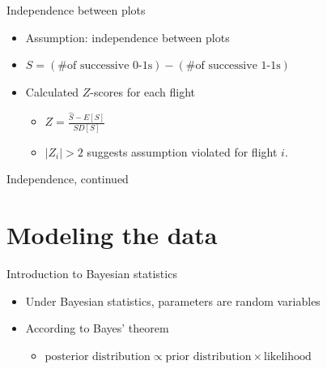 \documentclass{beamer}
\begin{document}
\begin{frame}{Independence between plots}
	\begin{itemize}
		\item Assumption: independence between plots
		\item $S=(\text{\# of successive 0-1s})-(\text{\# of successive 1-1s})$
		\item Calculated $Z$-scores for each flight
			\begin{itemize}
				\item $Z=\frac{\hat{S}-E[S]}{SD[S]}$
				\item $|Z_i|>2$ suggests assumption violated for flight $i$.
			\end{itemize}
	\end{itemize}
\end{frame}

\begin{frame}[label=currentslide]{Independence, continued}
	\begin{center}
	\end{center}
\end{frame}

\section{Modeling the data}
\begin{frame}{Introduction to Bayesian statistics}
	\begin{itemize}
		\item Under Bayesian statistics, parameters are random variables
		\item According to Bayes' theorem
		\begin{itemize}
			\item $\text{posterior distribution} \propto \text{prior 
			distribution}\times \text{likelihood}$
		\end{itemize}
	\end{itemize}
\end{frame}
\end{document}
